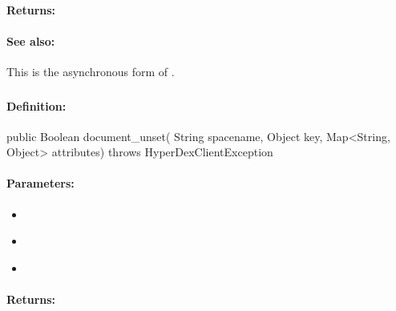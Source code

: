 \paragraph{Returns:}


\paragraph{See also:}  This is the asynchronous form of .

\pagebreak
\subsubsection{}
\label{api:java:document_unset}


\paragraph{Definition:}
\begin{javacode}
public Boolean document_unset(
        String spacename,
        Object key,
        Map<String, Object> attributes) throws HyperDexClientException
\end{javacode}

\paragraph{Parameters:}
\begin{itemize}[noitemsep]
\item {}\\

\item {}\\

\item {}\\

\end{itemize}

\paragraph{Returns:}



